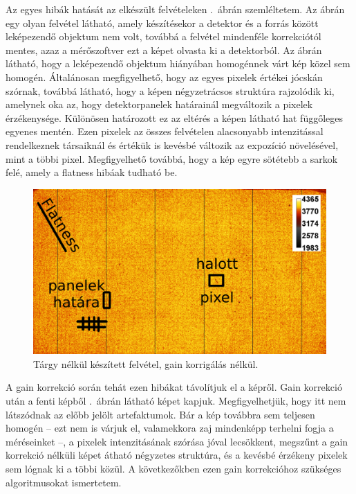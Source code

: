 \documentclass[a4paper,12pt]{article}
\begin{document}
Az egyes hibák hatását az elkészült felvételeken .~ábrán szemléltetem. Az ábrán egy olyan felvétel látható, amely készítésekor a detektor és a forrás között leképezendő objektum nem volt, továbbá a felvétel mindenféle korrekciótól mentes, azaz a mérőszoftver ezt a képet olvasta ki a detektorból. Az ábrán látható, hogy a leképezendő objektum hiányában homogénnek várt kép közel sem homogén. Általánosan megfigyelhető, hogy az egyes pixelek értékei jócskán szórnak, továbbá látható, hogy a képen négyzetrácsos struktúra rajzolódik ki, amelynek oka  az, hogy detektorpanelek határainál megváltozik a pixelek érzékenysége. Különösen határozott ez az eltérés a képen látható hat függőleges egyenes mentén. Ezen pixelek az összes felvételen alacsonyabb intenzitással rendelkeznek társaiknál és értékük is kevésbé változik az expozíció növelésével, mint a többi pixel. Megfigyelhető továbbá, hogy a kép egyre sötétebb a sarkok felé, amely a flatness hibáak tudható be.

\begin{figure}[htbp]
\center
\includegraphics[width=1.0\textwidth]{abrak/gainnelkul}
\caption{Tárgy nélkül készített felvétel, gain korrigálás nélkül.}
\label{fig:gainnelkul}
\end{figure}

A gain korrekció során tehát ezen hibákat távolítjuk el a képről. Gain korrekció után a fenti képből .~ábrán látható képet kapjuk. Megfigyelhetjük, hogy itt nem látszódnak az előbb jelölt artefaktumok. Bár a kép továbbra sem teljesen homogén -- ezt nem is várjuk el, valamekkora zaj mindenképp terhelni fogja a méréseinket --, a pixelek intenzitásának szórása jóval lecsökkent, megszűnt a gain korrekció nélküli képet átható négyzetes struktúra, és a kevésbé érzékeny pixelek sem lógnak ki a többi közül. A következőkben ezen  gain korrekcióhoz szükséges algoritmusokat ismertetem.
\end{document}
